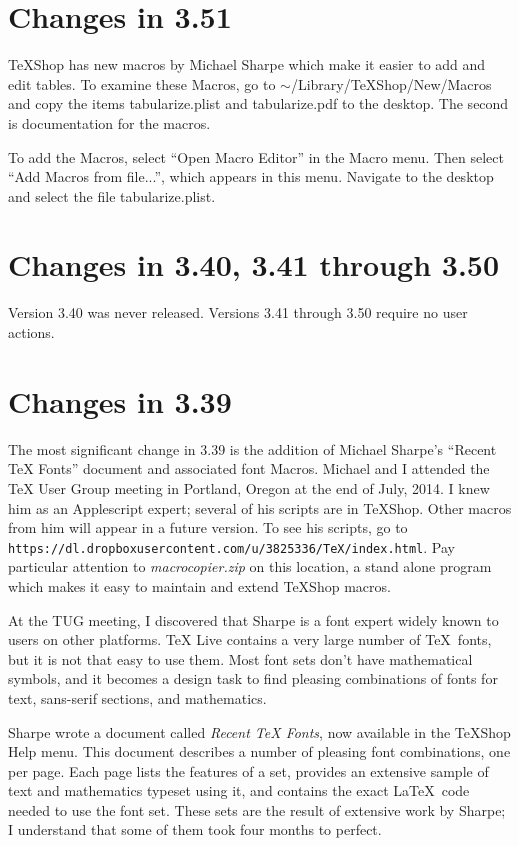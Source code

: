 \documentclass[11pt, oneside]{amsart}
\begin{document}
\section{Changes in 3.51}

TeXShop has new macros by Michael Sharpe which make it easier to add and edit tables. To
examine these Macros, go to $\sim$/Library/TeXShop/New/Macros and copy the items tabularize.plist and tabularize.pdf to the desktop. The second is documentation for the macros.

To add the Macros, select ``Open Macro Editor'' in the Macro menu. Then select ``Add Macros
from file...'', which appears in this menu. Navigate to the desktop and select the file
tabularize.plist.


\section{Changes in 3.40, 3.41 through 3.50}

Version 3.40 was never released. Versions 3.41 through 3.50 require no user actions.

\section{Changes in 3.39}

The most significant change in 3.39 is the addition of Michael Sharpe's ``Recent TeX Fonts'' document and associated font Macros.  Michael and I attended the TeX User Group meeting in Portland, Oregon at the end of July, 2014. I knew him as an Applescript expert; several of his scripts are in TeXShop. Other macros from him will appear in a future version. To see his scripts, go to 
\nolinkurl{https://dl.dropboxusercontent.com/u/3825336/TeX/index.html}. Pay particular attention to 
{\em macrocopier.zip} on this location, a stand alone program which makes it easy to maintain and extend TeXShop macros.

At the TUG meeting, I discovered that Sharpe is a font expert widely known to users on other platforms.
TeX Live contains a very large number of \TeX\ fonts, but it is not that easy to use them.
Most font sets don't have mathematical symbols, and it becomes a design task to find pleasing combinations of fonts for text, sans-serif sections, and mathematics.

Sharpe wrote a document called {\em Recent TeX Fonts}, now available in the TeXShop Help menu. This document describes a number of pleasing font combinations, one per page. Each page lists the features of a set, provides an extensive sample of text and mathematics typeset using
it, and contains the exact La\TeX\ code needed to use the font set. These sets are the result
of extensive work by Sharpe; I understand that some of them took four months to perfect.
\end{document}
